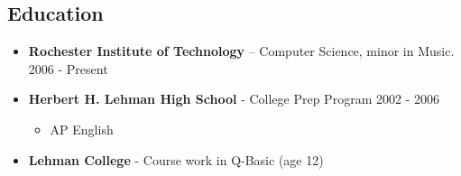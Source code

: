 \documentclass[margin]{res}
\begin{document}
 


\address{\textsf{{\bf School Address}} \\ \textsf{Rochester Institute of Technology}
\\ \textsf{Computer Science} \\ \textsf{39 Nathaniel Rochester Hall} \\
\textsf{Rochester, NY 14623}}
\address{\textsf{{\bf Permanent Address}} \\ \textsf{2710 Avenue J N/W} \\
\textsf{Winter Haven, FL 33881} \\ \textsf{(863) 514-7014} \\
\textsf{russ@eatnumber1.com}}
 
\begin{resume}

\section{\textsf{Education}}
	\begin{itemize} \itemsep -2pt
		\item {\bf Rochester Institute of Technology} – Computer Science, minor
		in Music. \hfill {\footnotesize 2006 - Present}
		\item {\bf Herbert H. Lehman High School} - College Prep Program \hfill
		{\footnotesize 2002 - 2006}
		\begin{itemize} \itemsep -2pt
			\item {\small AP English}
		\end{itemize}
		\item {\bf Lehman College} - Course work in Q-Basic (age 12)
	\end{itemize}


\end{resume}
\end{document}

